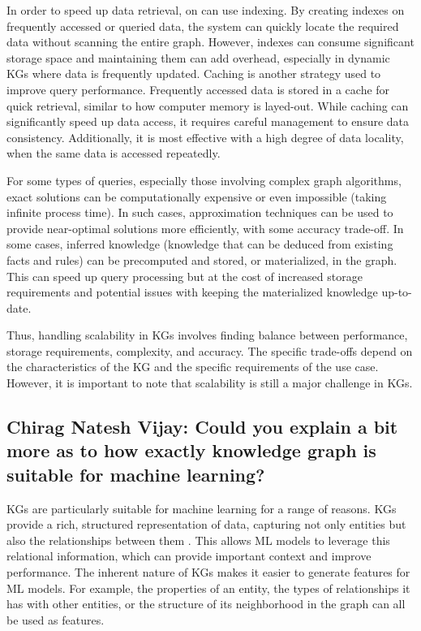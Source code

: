 \documentclass[11pt]{article} %
\begin{document}
In order to speed up data retrieval, on can use indexing. By creating indexes on frequently accessed or queried data, the system can quickly locate the required data without scanning the entire graph. However, indexes can consume significant storage space and maintaining them can add overhead, especially in dynamic KGs where data is frequently updated. Caching is another strategy used to improve query performance. Frequently accessed data is stored in a cache for quick retrieval, similar to how computer memory is layed-out. While caching can significantly speed up data access, it requires careful management to ensure data consistency. Additionally, it is most effective with a high degree of data locality, when the same data is accessed repeatedly.

For some types of queries, especially those involving complex graph algorithms, exact solutions can be computationally expensive or even impossible (taking infinite process time). In such cases, approximation techniques can be used to provide near-optimal solutions more efficiently, with some accuracy trade-off. In some cases, inferred knowledge (knowledge that can be deduced from existing facts and rules) can be precomputed and stored, or materialized, in the graph. This can speed up query processing but at the cost of increased storage requirements and potential issues with keeping the materialized knowledge up-to-date.

Thus, handling scalability in KGs involves finding balance between performance, storage requirements, complexity, and accuracy. The specific trade-offs depend on the characteristics of the KG and the specific requirements of the use case. However, it is important to note that scalability is still a major challenge in KGs.

\subsection{Chirag Natesh Vijay: Could you explain a bit more as to how exactly knowledge graph is suitable for machine learning?}

KGs are particularly suitable for machine learning for a range of reasons. KGs provide a rich, structured representation of data, capturing not only entities but also the relationships between them \cite*{KG21}. This allows ML models to leverage this relational information, which can provide important context and improve performance. The inherent nature of KGs makes it easier to generate features for ML models. For example, the properties of an entity, the types of relationships it has with other entities, or the structure of its neighborhood in the graph can all be used as features.
\end{document}
